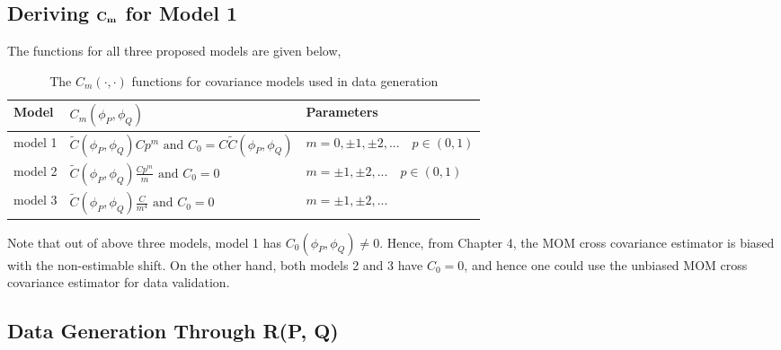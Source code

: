 	\subsection{Deriving ${\bf C_m}$ for Model 1}
	

The \Cm functions for all three proposed models are given below,
				\begin{table}[H]
				\centering
				\caption[The $C_m(\cdot, \cdot)$ Functions For Covariance Models Used in Data Generation]{The $C_m(\cdot, \cdot)$ functions for covariance models used in data generation}
				\label{Cm_table}
			  \vskip 16pt
				\begin{tabular}{|l|l|l|}
					\hline
					Model   & $C_m(\phi_P, \phi_Q)$                                         & Parameters                               \\
					\hline \hline
					model 1 & $\tilde{C}(\phi_P, \phi_Q) Cp^m  \mbox{ and } C_0 = C\tilde{C}(\phi_P, \phi_Q)$          & $m=0, \pm 1, \pm 2,... \quad p\in (0,1)$ \\
					model 2 & $\tilde{C}(\phi_P, \phi_Q) \frac{Cp^m}{m} \mbox{ and } C_0 = 0$ & $m=\pm 1, \pm 2,... \quad p\in (0,1)$    \\
					model 3 & $\tilde{C}(\phi_P, \phi_Q) \frac{C}{m^4} \mbox{ and } C_0 = 0$  & $m=\pm 1, \pm 2,...$                     \\
					\hline
				\end{tabular}
			\end{table}
Note that out of above three models, model 1 has $C_0(\phi_P, \phi_Q) \ne 0$. Hence, from Chapter 4, the MOM cross covariance estimator is biased with the non-estimable shift. On the other hand, both models 2 and 3 have $C_0 = 0$, and hence one could use the unbiased MOM cross covariance estimator for data validation. 

\subsection{Data Generation Through R(P, Q)}

